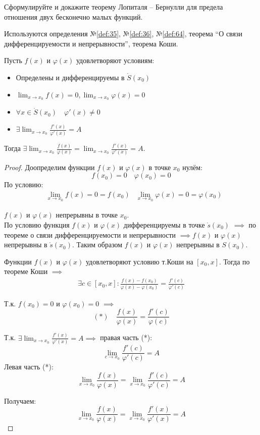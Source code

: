 \begin{question}
    Сформулируйте и докажите теорему Лопиталя – Бернулли для предела отношения двух бесконечно малых функций.
\end{question}
\begin{used}
    Используются определения №\ref{def:35}, №\ref{def:36}, №\ref{def:64}, теорема ``О связи дифференцируемости и непрерывности'', теорема Коши.
\end{used}
\begin{theorem}
    Пусть $f(x)$ и  $\varphi(x)$ удовлетворяют условиям:
    \begin{itemize}
        \item Определены и дифференцируемы в $\mathring{S}(x_0)$
        \item $\lim_{x \to x_0} f(x) = 0, \lim_{x \to x_0} \varphi(x) = 0$
        \item $\forall x \in \mathring{S}(x_0) \quad \varphi'(x) \neq 0$
        \item $\exists \lim_{x \to x_0} \frac{f'(x)}{\varphi'(x)} = A$
    \end{itemize}
    Тогда $\exists \lim_{x \to x_0} \frac{f(x)}{\varphi(x)} = \lim_{x \to x_0} \frac{f'(x)}{\varphi'(x)} = A$.
\end{theorem}
\begin{proof}
    Доопределим функции $f(x)$ и $\varphi(x)$ в точке $x_0$ нулём: \[
        f(x_0) = 0 \quad \varphi(x_0) = 0
    \] 
    По условию:
    \begin{align*}
        &\lim_{x \to x_0} f(x) = 0 = f(x_0)
        &\lim_{x \to x_0} \varphi(x) = 0 = \varphi(x_0)
    \end{align*}
  
    $f(x)$ и  $\varphi(x)$ непрерывны в точке $x_0$.\\
    По условию функция $f(x)$ и  $\varphi(x)$ дифференцируемы в точке $\mathring{s}(x_0)$ $\implies$ по теореме о связи дифференцируемости и непрерывности $\implies f(x)$ и $\varphi(x)$ непрерывны в $\mathring{s}(x_0)$. Таким образом $f(x)$ и  $\varphi(x)$ непрерывны в $S(x_0)$.

    Функции $f(x)$ и  $\varphi(x)$ удовлетворяют условию т.Коши на $[x_0, x]$. Тогда по теореме Коши $\implies$ 
    \begin{gather*}
        \exists c \in [x_0, x] : \frac{f(x) - f(x_0)}{\varphi(x) - \varphi(x_0)} = \frac{f'(c)}{\varphi'(c)} \tag{*} 
    \end{gather*}

    Т.к. $f(x_0) = 0$ и $\varphi(x_0) = 0$ $\implies$ \[
        (*) \quad \boxed{\frac{f(x)}{\varphi(x)} = \frac{f'(c)}{\varphi(c)}}
    \] 

    Т.к. $\exists \lim_{x \to x_0} \frac{f'(x)}{\varphi'(x)} = A \implies$ правая часть (*): \[
        \lim_{c \to x_0} \frac{f'(c)}{\varphi'(c)} = A
    \] 
    Левая часть (*): \[
        \lim_{x \to x_0} \frac{f(x)}{\varphi(x)} = \lim_{x \to x_0} \frac{f'(c)}{\varphi'(c)} = A
    \] 

    Получаем: \[
        \lim_{x \to x_0} \frac{f(x)}{\varphi(x)} = \lim_{x \to x_0} \frac{f'(x)}{\varphi'(x)} = A
    \] 
\end{proof}
\pagebreak



